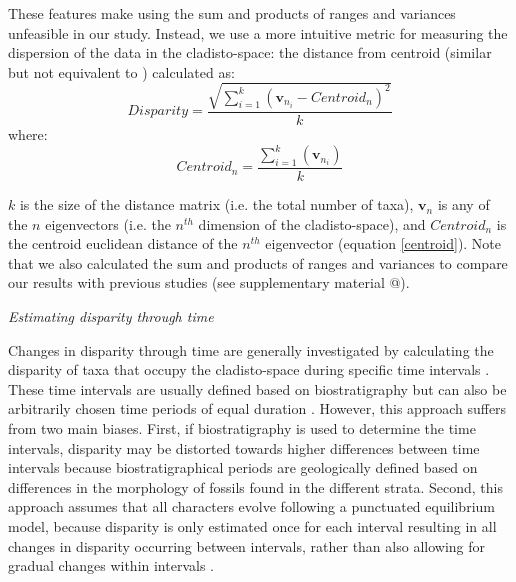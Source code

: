 \documentclass[12pt,letterpaper]{article}
\renewcommand{\subsection}[1]{%
\bigskip
\begin{center}
\begin{large}
\normalfont\itshape #1
\end{large}
\end{center}}
\begin{document}
These features make using the sum and products of ranges and variances unfeasible in our study.
Instead, we use a more intuitive %
metric for measuring the dispersion of the data in the cladisto-space: the distance from centroid (similar but not equivalent to \citealt{Wills1994,kornextinction2013,huang2015origins}) calculated as: %
\begin{equation}
    Disparity=\frac{\displaystyle\sqrt{\sum_{i=1}^{k}{(\mathbf{v}_{n_{i}}-Centroid_{n})^2}}}{k}
\end{equation}
where:
\begin{equation}
    Centroid_{n}=\frac{\displaystyle\sum_{i=1}^{k}(\mathbf{v}_{n_{i}})}{k}
    \label{centroid}
\end{equation}

\noindent
$k$ is the size of the distance matrix (i.e. the total number of taxa), $\mathbf{v}_{n}$ is any of the $n$ eigenvectors (i.e. the $n^{th}$ dimension of the cladisto-space),%
 and $Centroid_{n}$ is the centroid euclidean distance of the $n^{th}$ eigenvector (equation \ref{centroid}).
Note that we also calculated the sum and products of ranges and variances to compare our results with previous studies (see supplementary material @). %

\subsection{Estimating disparity through time} 
Changes in disparity through time are generally investigated by calculating the disparity of taxa that occupy the cladisto-space during specific time intervals \citep[e.g][]{cisneros2010,prentice2011,Hughes20082013,hopkinsdecoupling2013,bentonmodels2014,bensonfaunal2014}.
These time intervals are usually defined based on biostratigraphy \citep[e.g.][]{cisneros2010,prentice2011,Hughes20082013,bentonmodels2014} but can also be arbitrarily chosen time periods of equal duration \citep{hopkinsdecoupling2013,bensonfaunal2014}.
However, this approach suffers from two main biases. 
First, if biostratigraphy is used to determine the time intervals, disparity may be distorted towards higher differences between time intervals because biostratigraphical %
 periods are geologically defined based on differences in the morphology of fossils found in the different strata.
Second, this approach assumes that all characters evolve following a punctuated equilibrium model, because disparity is only estimated once for each interval resulting in all changes in disparity occurring between intervals, rather than also allowing for gradual changes within intervals \citep{Hunt21042015}.
\end{document}
